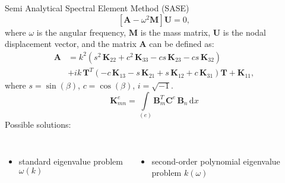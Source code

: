 \documentclass[10pt,aspectratio=169,dvipsnames]{beamer} %
\newcommand{\matr}[1]{\mathbf{#1}} %
\newcommand{\vect}[1]{\mathbf{#1}} %
\newcommand{\ud}{\mathrm{d}}
\begin{document}
\begin{frame}[t]{Semi Analytical Spectral Element Method (SASE)}
		\begin{equation*}
			\left[\matr{A} - \omega^2\matr{M} \right] \vect{U} =0,
			\label{eq:eig_dispersion}
		\end{equation*}
		where $\omega$ is the angular frequency, $\matr{M}$ is the mass matrix, $\matr{U}$ is the nodal displacement vector, and the matrix $\matr{A}$ can be defined as:
		\begin{equation*}
			\begin{aligned}
				\matr{A} & =  k^2\left(s^2 \,\matr{K}_{22} + c^2\, \matr{K}_{33} - c s\, \matr{K}_{23} - c s\, \matr{K}_{32}\right) \\
				& + i k\, \matr{T}^T\left(-c\, \matr{K}_{13} - s\, \matr{K}_{21} + s\, \matr{K}_{12} + c\, \matr{K}_{31}\right) \matr{T} +\matr{K}_{11},
			\end{aligned}
			\label{eq:dispersion}
		\end{equation*}
		where  $s = \sin(\beta)$, $c = \cos(\beta)$, $i = \sqrt{-1}$.
		\begin{equation*}
			\matr{K}_{mn}^e= \int \limits_{(e)} \matr{B}_m^{T} \matr{C}^e \, \matr{B}_n\, \ud x
			\label{eq:stiffness_matrix_e}
		\end{equation*}
		Possible solutions:
		\begin{columns}[T]
			\begin{itemize}
				\item standard eigenvalue problem $\omega (k)$
			\end{itemize}
			\begin{itemize}
				\item second-order polynomial eigenvalue problem $k(\omega)$
			\end{itemize}
		\end{columns}
\end{frame}
\end{document}
